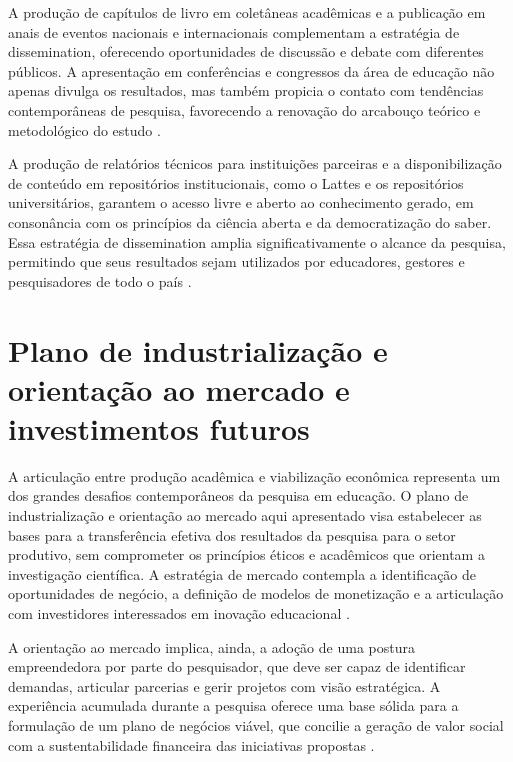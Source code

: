 A produção de capítulos de livro em coletâneas acadêmicas e a publicação em anais de eventos nacionais e internacionais complementam a estratégia de dissemination, oferecendo oportunidades de discussão e debate com diferentes públicos. A apresentação em conferências e congressos da área de educação não apenas divulga os resultados, mas também propicia o contato com tendências contemporâneas de pesquisa, favorecendo a renovação do arcabouço teórico e metodológico do estudo \cite{SOUSA2025}.

A produção de relatórios técnicos para instituições parceiras e a disponibilização de conteúdo em repositórios institucionais, como o Lattes e os repositórios universitários, garantem o acesso livre e aberto ao conhecimento gerado, em consonância com os princípios da ciência aberta e da democratização do saber. Essa estratégia de dissemination amplia significativamente o alcance da pesquisa, permitindo que seus resultados sejam utilizados por educadores, gestores e pesquisadores de todo o país \cite{TEODORO2024}.

\section{Plano de industrialização e orientação ao mercado e investimentos futuros}
\label{sec:industrializacao_mercado}

A articulação entre produção acadêmica e viabilização econômica representa um dos grandes desafios contemporâneos da pesquisa em educação. O plano de industrialização e orientação ao mercado aqui apresentado visa estabelecer as bases para a transferência efetiva dos resultados da pesquisa para o setor produtivo, sem comprometer os princípios éticos e acadêmicos que orientam a investigação científica. A estratégia de mercado contempla a identificação de oportunidades de negócio, a definição de modelos de monetização e a articulação com investidores interessados em inovação educacional \cite{BACICH2018}.

A orientação ao mercado implica, ainda, a adoção de uma postura empreendedora por parte do pesquisador, que deve ser capaz de identificar demandas, articular parcerias e gerir projetos com visão estratégica. A experiência acumulada durante a pesquisa oferece uma base sólida para a formulação de um plano de negócios viável, que concilie a geração de valor social com a sustentabilidade financeira das iniciativas propostas \cite{LIBANEO2006}.

